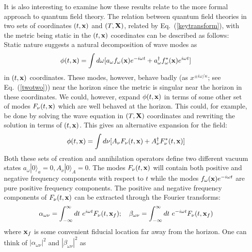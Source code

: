 \documentclass[12pt]{iopart}
\def\eq#1{{Eq.~(\ref{#1})}}
\begin{document}
      
 



 It is also interesting to examine how these results relate to the more formal approach to quantum field theory.
       The relation between quantum field theories in 
   two sets of coordinates $(t,{\bf x})$ and $(T,{\bf X})$,
   related by  
        Eq.~(\ref{keytransform}),  with the metric being 
     static in the $(t,{\bf x})$ coordinates can be 
     described as follows:  
  Static nature suggests a natural decomposition of wave modes
     as 
     \begin{equation}
     \phi(t,{\bf x}) = \int d\omega  [a_\omega  f_\omega  ({\bf x}) e^{-i\omega t} 
     + a_\omega ^\dagger f_\omega ^* ({\bf x}) e^{i\omega t}]
     \end{equation}
     in $(t,{\bf x})$ coordinates.
     These modes, however,  behave badly (as $x^{\pm i\omega/\kappa }$; see \eq{twotwo})
     near the horizon since the metric is singular near the horizon in these coordinates. 
     We could, however, expand $\phi(t,{\bf x})$ in terms of some other set of 
     modes $F_\nu (t,{\bf x})$ which are well behaved at the horizon. This could, for example, 
     be done by solving the wave equation in $(T,{\bf X})$ coordinates and rewriting the solution
     in terms of $(t,{\bf x})$. This gives an alternative expansion for the field:
     \begin{equation}
     \phi(t,{\bf x}) = \int d\nu [A_\nu F_\nu (t,{\bf x})  + A_\nu^\dagger F_\nu^* (t,{\bf x}) ]
     \end{equation}
     Both these sets of creation and annihilation operators define two 
     different vacuum states $a_\omega|0\rangle _a =0, A_\nu |0\rangle _A=0$.
     The modes $F_\nu(t,{\bf x})$ will contain both positive and negative frequency components
     with respect to $t$
     while the modes $f_\omega ({\bf x}) e^{-i\omega t}$ are pure positive frequency components.
     The positive and negative frequency components of $F_\nu(t,{\bf x})$ 
      can be extracted through the Fourier transforms:
        \begin{equation}
     \alpha_{\omega \nu} = \int_{-\infty}^\infty dt \ e^{i\omega t} F_\nu (t, {\bf x}_f); \quad
      \beta _{\omega \nu} = \int_{-\infty}^\infty dt \ e^{-i\omega t} F_\nu (t, {\bf x}_f)
     \label{bogo}      
     \end{equation}
     where ${\bf x}_f$ is some convenient fiducial location far away from the horizon.
     One can think of $|\alpha_{\omega \nu}|^2$ and $|\beta_{\omega \nu}|^2$ as
\end{document}
